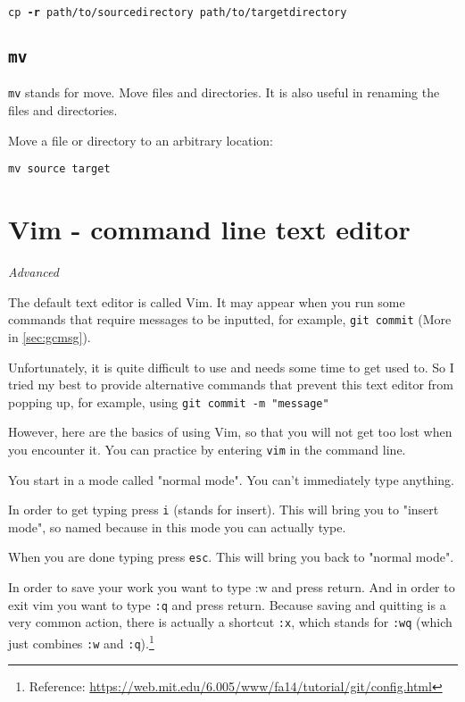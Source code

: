\texttt{cp \textbf{-r} path/to/source\textunderscore directory path/to/target\textunderscore directory}

\subsection{\texttt{mv}}

\texttt{mv} stands for move. Move files and directories. It is also useful in renaming the files and directories.
\vspace{6mm}

Move a file or directory to an arbitrary location:

\texttt{mv source target}

\section{Vim - command line text editor}
\label{sec:vim}

\textit{Advanced}
\vspace{6mm}

The default text editor is called Vim. It may appear when you run some commands that require messages to be inputted, for example, \texttt{git commit} (More in \cref{sec:gcmsg}).

Unfortunately, it is quite difficult to use and needs some time to get used to. So I tried my best to provide alternative commands that prevent this text editor from popping up, for example, using \texttt{git commit -m "message"}

However, here are the basics of using Vim, so that you will not get too lost when you encounter it. You can practice by entering \texttt{vim} in the command line.

You start in a mode called "normal mode". You can’t immediately type anything.

In order to get typing press \texttt{i} (stands for insert). This will bring you to "insert mode", so named because in this mode you can actually type.

When you are done typing press \texttt{esc}. This will bring you back to "normal mode".

In order to save your work you want to type :w and press return. And in order to exit vim you want to type \texttt{:q} and press return. Because saving and quitting is a very common action, there is actually a shortcut \texttt{:x}, which stands for \texttt{:wq} (which just combines \texttt{:w} and \texttt{:q}).\footnote{Reference: \url{https://web.mit.edu/6.005/www/fa14/tutorial/git/config.html}}


